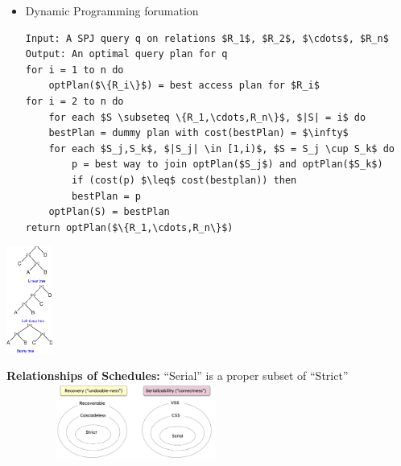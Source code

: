 \documentclass[10pt,landscape]{article}
\newcommand{\1}{\mathmybb{1}}
\begin{document}
\begin{multicols*}{3}
\begin{minipage}[t]{0.77\columnwidth}
    \begin{itemize}
        \item Dynamic Programming forumation
        \begin{lstlisting}[mathescape=true,basicstyle=\tiny\ttfamily]
Input: A SPJ query q on relations $R_1$, $R_2$, $\cdots$, $R_n$
Output: An optimal query plan for q
for i = 1 to n do
    optPlan($\{R_i\}$) = best access plan for $R_i$
for i = 2 to n do
    for each $S \subseteq \{R_1,\cdots,R_n\}$, $|S| = i$ do
    bestPlan = dummy plan with cost(bestPlan) = $\infty$
    for each $S_j,S_k$, $|S_j| \in [1,i)$, $S = S_j \cup S_k$ do
        p = best way to join optPlan($S_j$) and optPlan($S_k$)
        if (cost(p) $\leq$ cost(bestplan)) then
        bestPlan = p
    optPlan(S) = bestPlan
return optPlan($\{R_1,\cdots,R_n\}$)
        \end{lstlisting}
    \end{itemize}
\end{minipage}%
\hfill
\begin{minipage}[t]{0.22\columnwidth}
    \vspace{-0.5em}
    \includegraphics[width=\columnwidth, height=3.5cm]{images/typesofqueryplans.png}
\end{minipage}

\textbf{Relationships of Schedules:} “Serial” is a proper subset of “Strict”
\includegraphics*[width=8.5cm, height=2.5cm]{images/relationshipsofschedules.png}


\end{multicols*}
\end{document}
